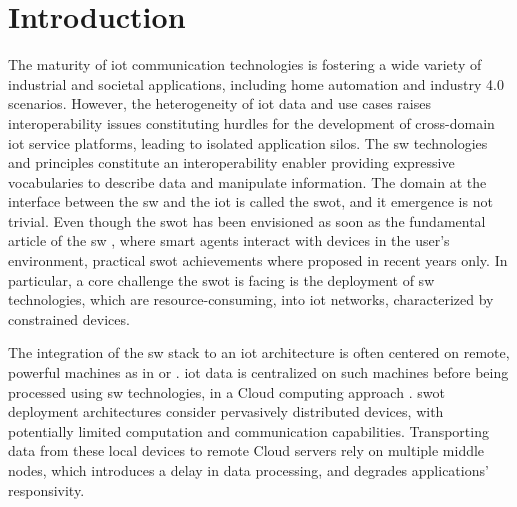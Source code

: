 \documentclass{iosart2c}
\begin{document}
\section{Introduction}

The maturity of \gls{iot} communication technologies is fostering a wide variety of industrial and societal applications, including home automation and industry 4.0 scenarios. 
However, the heterogeneity of \gls{iot} data and use cases raises interoperability issues constituting hurdles for the development of cross-domain \gls{iot} service platforms, leading to isolated application silos. 
The \gls{sw} technologies and principles constitute an interoperability enabler providing expressive vocabularies to describe data and manipulate information.
The domain at the interface between the \gls{sw} and the \gls{iot} is called the \gls{swot}, and it emergence is not trivial. 
Even though the \gls{swot} has been envisioned as soon as the fundamental article of the \gls{sw} \cite{Berners-Lee2001}, where smart agents interact with devices in the user's environment, practical \gls{swot} achievements where proposed in recent years only\cite{Pfisterer2011}.
In particular, a core challenge the \gls{swot} is facing is the deployment of \gls{sw} technologies, which are resource-consuming, into \gls{iot} networks, characterized by constrained devices. 

The integration of the \gls{sw} stack to an \gls{iot} architecture is often centered on remote, powerful machines as in \cite{Gyrard2017} or \cite{Wang2018}. 
\gls{iot} data is centralized on such machines before being processed using \gls{sw} technologies, in a Cloud computing approach \cite{Mell2011}.
\gls{swot} deployment architectures consider pervasively distributed devices, with potentially limited computation and communication capabilities. 
Transporting data from these local devices to remote Cloud servers rely on multiple middle nodes, which introduces a delay in data processing, and degrades applications' responsivity.
\end{document}
